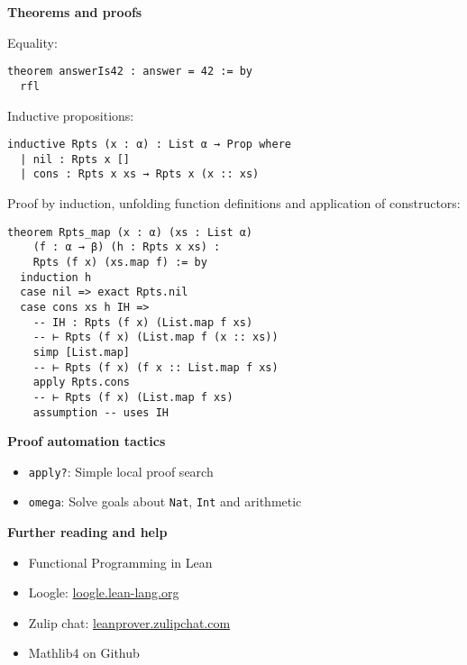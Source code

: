 \documentclass[11pt,DIV=16,parskip=half,headings=normal,abstract]{scrartcl}
\newcommand{\li}{\lstinline}
\begin{document}
\begin{multicols*}{2}
\columnbreak
\textbf{Theorems and proofs}

Equality:
\begin{lstlisting}
theorem answerIs42 : answer = 42 := by
  rfl
\end{lstlisting}

\goodbreak

Inductive propositions:
\begin{lstlisting}
inductive Rpts (x : α) : List α → Prop where
  | nil : Rpts x []
  | cons : Rpts x xs → Rpts x (x :: xs)
\end{lstlisting}

Proof by induction, unfolding function definitions and application of constructors:
\begin{lstlisting}
theorem Rpts_map (x : α) (xs : List α)
    (f : α → β) (h : Rpts x xs) :
    Rpts (f x) (xs.map f) := by
  induction h
  case nil => exact Rpts.nil
  case cons xs h IH =>
    -- IH : Rpts (f x) (List.map f xs)
    -- ⊢ Rpts (f x) (List.map f (x :: xs))
    simp [List.map]
    -- ⊢ Rpts (f x) (f x :: List.map f xs)
    apply Rpts.cons
    -- ⊢ Rpts (f x) (List.map f xs)
    assumption -- uses IH
\end{lstlisting}

\textbf{Proof automation tactics}
\begin{itemize}
\item \li{apply?}: Simple local proof search
\item \li{omega}: Solve goals about \li{Nat}, \li{Int} and arithmetic
\end{itemize}

\textbf{Further reading and help}
\begin{itemize}
\item Functional Programming in Lean %
\item Loogle: \href{https://loogle.lean-lang.org/}{loogle.lean-lang.org}
\item Zulip chat: \href{https://leanprover.zulipchat.com/}{leanprover.zulipchat.com}
\item Mathlib4 on Github %
\end{itemize}



\end{multicols*}
\end{document}

